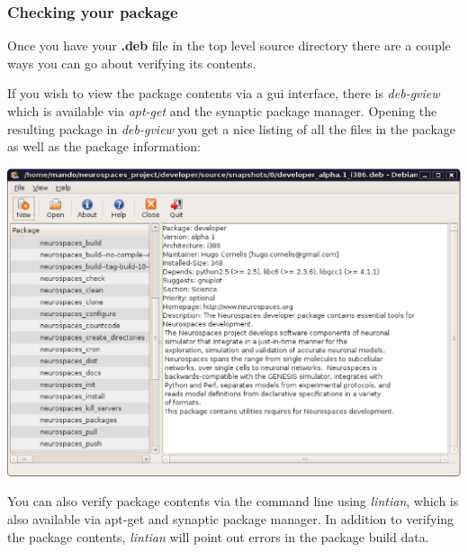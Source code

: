 \documentclass[12pt]{article}
\begin{document}
\subsubsection*{Checking your package}

Once you have your {\bf .deb} file in the top level source directory there are a couple ways you can go about verifying its contents. 

If you wish to view the package contents via a gui interface, there is {\it deb-gview} which is available via {\it apt-get} and the synaptic package manager. Opening  the resulting package in {\it deb-gview} you get a nice listing of all the files in the package as well as the package information:


\includegraphics[scale=0.4]{figures/deb-gview.eps}

You can also verify package contents via the command line using {\it lintian}, which is also available via apt-get and synaptic package manager. In addition to verifying the package contents, {\it lintian} will point out errors in the package build data. 
\end{document}
